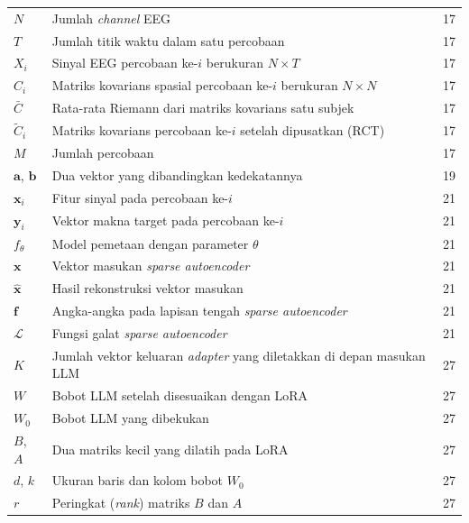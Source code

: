 \begin{longtable}{@{} l >{\raggedright\arraybackslash}p{6.5cm} c @{}}

$N$ & Jumlah \textit{channel} EEG & 17 \\
$T$ & Jumlah titik waktu dalam satu percobaan & 17 \\
$X_i$ & Sinyal EEG percobaan ke-$i$ berukuran $N \times T$ & 17 \\
$C_i$ & Matriks kovarians spasial percobaan ke-$i$ berukuran $N \times N$ & 17 \\
$\bar{C}$ & Rata-rata Riemann dari matriks kovarians satu subjek & 17 \\
$\tilde{C}_i$ & Matriks kovarians percobaan ke-$i$ setelah dipusatkan (RCT) & 17 \\
$M$ & Jumlah percobaan & 17 \\[1ex]


$\mathbf{a}$, $\mathbf{b}$ & Dua vektor yang dibandingkan kedekatannya & 19 \\
$\mathbf{x}_i$ & Fitur sinyal pada percobaan ke-$i$ & 21 \\
$\mathbf{y}_i$ & Vektor makna target pada percobaan ke-$i$ & 21 \\
$f_{\theta}$ & Model pemetaan dengan parameter $\theta$ & 21 \\
$\mathbf{x}$ & Vektor masukan \textit{sparse autoencoder} & 21 \\
$\hat{\mathbf{x}}$ & Hasil rekonstruksi vektor masukan & 21 \\
$\mathbf{f}$ & Angka-angka pada lapisan tengah \textit{sparse autoencoder} & 21 \\
$\mathcal{L}$ & Fungsi galat \textit{sparse autoencoder} & 21 \\[1ex]


$K$ & Jumlah vektor keluaran \textit{adapter} yang diletakkan di depan masukan LLM & 27 \\
$W$ & Bobot LLM setelah disesuaikan dengan LoRA & 27 \\
$W_0$ & Bobot LLM yang dibekukan & 27 \\
$B$, $A$ & Dua matriks kecil yang dilatih pada LoRA & 27 \\
$d$, $k$ & Ukuran baris dan kolom bobot $W_0$ & 27 \\
$r$ & Peringkat (\textit{rank}) matriks $B$ dan $A$ & 27 \\[1ex]


\end{longtable}

